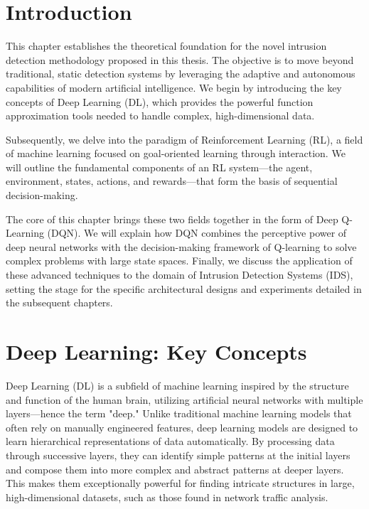 \documentclass{report}
\begin{document}
\section{Introduction}
This chapter establishes the theoretical foundation for the novel intrusion detection methodology proposed in this thesis. The objective is to move beyond traditional, static detection systems by leveraging the adaptive and autonomous capabilities of modern artificial intelligence. We begin by introducing the key concepts of Deep Learning (DL), which provides the powerful function approximation tools needed to handle complex, high-dimensional data.

Subsequently, we delve into the paradigm of Reinforcement Learning (RL), a field of machine learning focused on goal-oriented learning through interaction. We will outline the fundamental components of an RL system—the agent, environment, states, actions, and rewards—that form the basis of sequential decision-making.

The core of this chapter brings these two fields together in the form of Deep Q-Learning (DQN). We will explain how DQN combines the perceptive power of deep neural networks with the decision-making framework of Q-learning to solve complex problems with large state spaces. Finally, we discuss the application of these advanced techniques to the domain of Intrusion Detection Systems (IDS), setting the stage for the specific architectural designs and experiments detailed in the subsequent chapters.

\section{Deep Learning: Key Concepts}
Deep Learning (DL) is a subfield of machine learning inspired by the structure and function of the human brain, utilizing artificial neural networks with multiple layers—hence the term "deep." Unlike traditional machine learning models that often rely on manually engineered features, deep learning models are designed to learn hierarchical representations of data automatically. By processing data through successive layers, they can identify simple patterns at the initial layers and compose them into more complex and abstract patterns at deeper layers. This makes them exceptionally powerful for finding intricate structures in large, high-dimensional datasets, such as those found in network traffic analysis.
\end{document}
